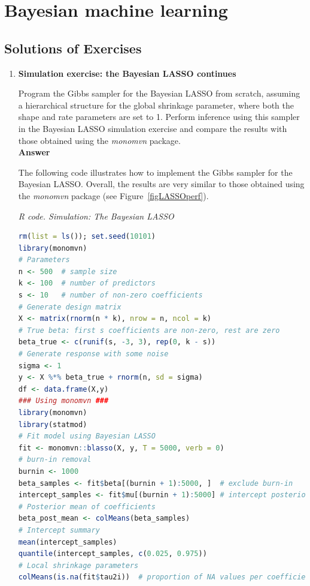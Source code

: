 \chapter{Bayesian machine learning}\label{chap13}

\section*{Solutions of Exercises}\label{sec13_1}
\begin{enumerate}[leftmargin=*]

	\item \textbf{Simulation exercise: the Bayesian LASSO continues}

Program the Gibbs sampler for the Bayesian LASSO from scratch, assuming a hierarchical structure for the global shrinkage parameter, where both the shape and rate parameters are set to 1. Perform inference using this sampler in the Bayesian LASSO simulation exercise and compare the results with those obtained using the \textit{monomvn} package.\\

\textbf{Answer}

The following code illustrates how to implement the Gibbs sampler for the Bayesian LASSO. Overall, the results are very similar to those obtained using the \textit{monomvn} package (see Figure~\ref{figLASSOperf}).

\begin{tcolorbox}[enhanced,width=4.67in,center upper,
	fontupper=\large\bfseries,drop shadow southwest,sharp corners]
	\textit{R code. Simulation: The Bayesian LASSO}
	\begin{VF}
		\begin{lstlisting}[language=R]
rm(list = ls()); set.seed(10101)
library(monomvn)
# Parameters
n <- 500  # sample size
k <- 100  # number of predictors
s <- 10   # number of non-zero coefficients
# Generate design matrix
X <- matrix(rnorm(n * k), nrow = n, ncol = k)
# True beta: first s coefficients are non-zero, rest are zero
beta_true <- c(runif(s, -3, 3), rep(0, k - s))
# Generate response with some noise
sigma <- 1
y <- X %*% beta_true + rnorm(n, sd = sigma)
df <- data.frame(X,y)
### Using monomvn ###
library(monomvn)
library(statmod)
# Fit model using Bayesian LASSO
fit <- monomvn::blasso(X, y, T = 5000, verb = 0)
# burn-in removal
burnin <- 1000
beta_samples <- fit$beta[(burnin + 1):5000, ]  # exclude burn-in
intercept_samples <- fit$mu[(burnin + 1):5000] # intercept posterior draws
# Posterior mean of coefficients
beta_post_mean <- colMeans(beta_samples)
# Intercept summary
mean(intercept_samples)
quantile(intercept_samples, c(0.025, 0.975))
# Local shrinkage parameters
colMeans(is.na(fit$tau2i))  # proportion of NA values per coefficient


\end{lstlisting}
\end{VF}
\end{tcolorbox}
\end{enumerate}
